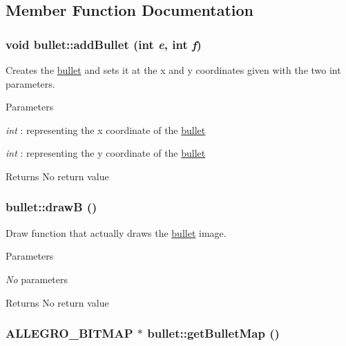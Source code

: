 \subsection{Member Function Documentation}
\hypertarget{classbullet_a426140d3b62940f83861048560a570bd}{
\subsubsection[{addBullet}]{\setlength{\rightskip}{0pt plus 5cm}void bullet::addBullet (int {\em e}, \/  int {\em f})}}
\label{classbullet_a426140d3b62940f83861048560a570bd}


Creates the \hyperlink{classbullet}{bullet} and sets it at the x and y coordinates given with the two int parameters. 
\begin{DoxyParams}{Parameters}
\item[{\em int}]: representing the x coordinate of the \hyperlink{classbullet}{bullet} \item[{\em int}]: representing the y coordinate of the \hyperlink{classbullet}{bullet} \end{DoxyParams}
\begin{DoxyReturn}{Returns}
No return value 
\end{DoxyReturn}
\hypertarget{classbullet_a93cf5a76bb99163b52f5e42a359ea2e8}{
\subsubsection[{drawB}]{\setlength{\rightskip}{0pt plus 5cm}bullet::drawB ()}}
\label{classbullet_a93cf5a76bb99163b52f5e42a359ea2e8}


Draw function that actually draws the \hyperlink{classbullet}{bullet} image. 
\begin{DoxyParams}{Parameters}
\item[{\em No}]parameters \end{DoxyParams}
\begin{DoxyReturn}{Returns}
No return value 
\end{DoxyReturn}
\hypertarget{classbullet_a16ea275b798ae9236015b3ff2e8fcb25}{
\subsubsection[{getBulletMap}]{\setlength{\rightskip}{0pt plus 5cm}ALLEGRO\_\-BITMAP $\ast$ bullet::getBulletMap ()}}
\label{classbullet_a16ea275b798ae9236015b3ff2e8fcb25}


